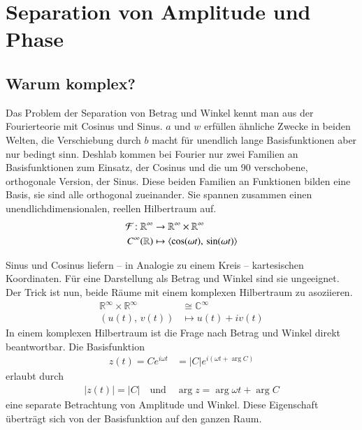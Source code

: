 \section{Separation von Amplitude und Phase}
\label{complex:separate}
\subsection{Warum komplex?}
Das Problem der Separation von Betrag und Winkel kennt man aus der Fourierteorie mit Cosinus und Sinus.
$a$ und $w$ erfüllen ähnliche Zwecke in beiden Welten, die Verschiebung durch $b$ macht für unendlich lange Basisfunktionen aber nur bedingt sinn.
Deshlab kommen bei Fourier nur zwei Familien an Basisfunktionen zum Einsatz, der Cosinus und die um 90\textdegree{} verschobene, orthogonale Version, der Sinus.
Diese beiden Familien an Funktionen bilden eine Basis, sie sind alle orthogonal zueinander.
Sie spannen zusammen einen unendlichdimensionalen, reellen Hilbertraum auf. %
\begin{align*}
	\Four : \mathbb{R}^\infty &\to \mathbb{R}^\infty  \times \mathbb{R}^\infty\\
	C^\infty(\mathbb{R}) &\mapsto \langle\cos(\omega t),\, \sin(\omega t)\rangle
\end{align*}

Sinus und Cosinus liefern -- in Analogie zu einem Kreis -- kartesischen Koordinaten. 
Für eine Darstellung als Betrag und Winkel sind sie ungeeignet.
Der Trick ist nun, beide Räume mit einem komplexen Hilbertraum zu asoziieren.
\begin{align*}
	\mathbb{R}^\infty  \times \mathbb{R}^\infty &\cong \mathbb{C}^\infty\\
	(u(t),\, v(t)) &\mapsto u(t) + iv(t) %
\end{align*}
In einem komplexen Hilbertraum ist die Frage nach Betrag und Winkel direkt beantwortbar.
Die Basisfunktion
\begin{align*}
	z(t) = Ce^{i\omega t} &= |C|e^{i\left(\omega t + \arg C\right)}
\end{align*}
erlaubt durch 
\begin{align*}
	|z(t)| = |C| \quad \text{und}\quad
	\arg z = \arg \omega t + \arg C
\end{align*}
eine separate Betrachtung von Amplitude und Winkel.
Diese Eigenschaft überträgt sich von der Basisfunktion auf den ganzen Raum.

